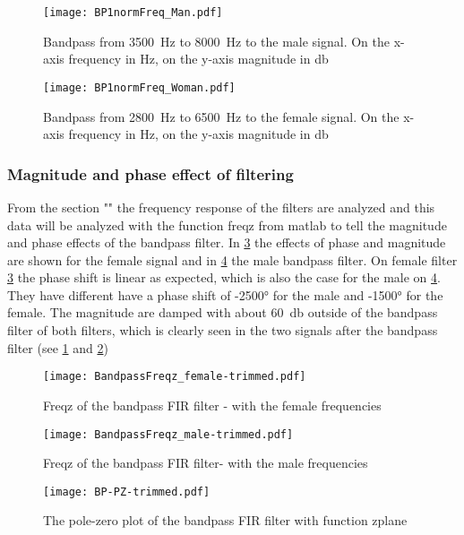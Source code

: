 \begin{figure}[h]
	\centering
	\texttt{[image: BP1normFreq\_Man.pdf]}
	\caption{Bandpass from \SI{3500}{\hertz} to \SI{8000}{\hertz} to the male signal. On the x-axis frequency in \si{\hertz}, on the y-axis magnitude in \si{\decibel}}
	\label{fig:maleBP}
\end{figure}

\begin{figure}[h]
	\centering
	\texttt{[image: BP1normFreq\_Woman.pdf]}
	\caption{Bandpass from \SI{2800}{\hertz} to \SI{6500}{\hertz} to the female signal. On the x-axis frequency in \si{\hertz}, on the y-axis magnitude in \si{\decibel}}
	\label{fig:femaleBP}
\end{figure}


\subsubsection{Magnitude and phase effect of filtering}
From the section "" the frequency response of the filters are analyzed and this data will be analyzed with the function freqz from matlab to tell the magnitude and phase effects of the bandpass filter. In \cref{fig:freqzBP} the effects of phase and magnitude are shown for the female signal and in \cref{fig:freqzBPMale} the male bandpass filter. On female filter \cref{fig:freqzBP} the phase shift is linear as expected, which is also the case for the male on \cref{fig:freqzBPMale}. They have different have a phase shift of \ang{-2500} for the male and \ang{-1500} for the female. The magnitude are damped with about \SI{60}{\decibel} outside of the bandpass filter of both filters, which is clearly seen in the two signals after the bandpass filter (see \cref{fig:maleBP} and \cref{fig:femaleBP})

\begin{figure}[h]
	\centering
	\texttt{[image: BandpassFreqz\_female-trimmed.pdf]}
	\caption{Freqz of the bandpass FIR filter - with the female frequencies}
	\label{fig:freqzBP}
\end{figure}

\begin{figure}[h]
	\centering
	\texttt{[image: BandpassFreqz\_male-trimmed.pdf]}
	\caption{Freqz of the bandpass FIR filter- with the male frequencies}
	\label{fig:freqzBPMale}
\end{figure}

\begin{figure}
	\centering
	\texttt{[image: BP-PZ-trimmed.pdf]}
	\caption{The pole-zero plot of the bandpass FIR filter with function zplane}
	\label{fig:BP-zplane}
\end{figure}

